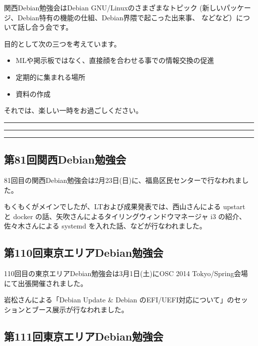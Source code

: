\documentclass[mingoth,a4paper]{jsarticle}
\begin{document}
 関西Debian勉強会はDebian GNU/Linuxのさまざまなトピック
 (新しいパッケージ、Debian特有の機能の仕組、Debian界隈で起こった出来事、
 などなど）について話し合う会です。

 目的として次の三つを考えています。
 \begin{itemize}
  \item MLや掲示板ではなく、直接顔を合わせる事での情報交換の促進
  \item 定期的に集まれる場所
  \item 資料の作成
 \end{itemize}

 それでは、楽しい一時をお過ごしください。

\newpage

\begin{minipage}[b]{0.2\hsize}
 {}
\end{minipage}
\begin{minipage}[b]{0.8\hsize}
\hrule
\vspace{2mm}
\hrule
\setcounter{tocdepth}{1}
\tableofcontents
\vspace{2mm}
\hrule
\end{minipage}


\subsection{第81回関西Debian勉強会}

81回目の関西Debian勉強会は2月23日(日)に、福島区民センターで行なわれまし
た。

もくもくがメインでしたが、LTおよび成果発表では、西山さんによる upstart と
docker の話、矢吹さんによるタイリングウィンドウマネージャ i3 の紹介、
佐々木さんによる systemd を入れた話、などが行なわれました。

\subsection{第110回東京エリアDebian勉強会}

110回目の東京エリアDebian勉強会は3月1日(土)にOSC 2014 Tokyo/Spring会場
にて出張開催されました。

岩松さんによる「Debian Update \& Debian のEFI/UEFI対応について」のセッ
ションとブース展示が行なわれました。

\subsection{第111回東京エリアDebian勉強会}
\end{document}
